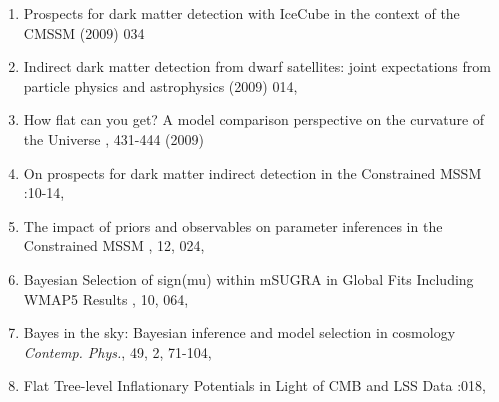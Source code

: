 \begin{enumerate}
\item 
{}
{Prospects for dark matter detection with IceCube in the context of the CMSSM}
{ (2009) 034 }

\item 
\onestar {}
{Indirect dark matter detection from dwarf satellites: joint expectations from particle physics and astrophysics}
{ (2009) 014, }

\item 
{}
{How flat can you get? A model comparison perspective on the curvature of the Universe}
{ , 431-444 (2009) }

\item 
{}
{On prospects for dark matter indirect detection in the Constrained MSSM}
{:10-14, }
 
\item  
\onestar {}
{The impact of priors and observables on parameter inferences in the Constrained MSSM}
{\JHEP, 12, 024, }

\item 
\onestar {}
{Bayesian Selection of sign(mu) within mSUGRA in Global Fits Including WMAP5 Results}
{\JHEP, 10, 064, }

\item  
\fourstars {}
{Bayes in the sky: Bayesian inference and model selection in cosmology}
{{\em Contemp. Phys.}, 49, 2, 71-104,  }

\item 
{}
{Flat Tree-level Inflationary Potentials in Light of CMB and LSS Data}
{:018, }


\end{enumerate}
